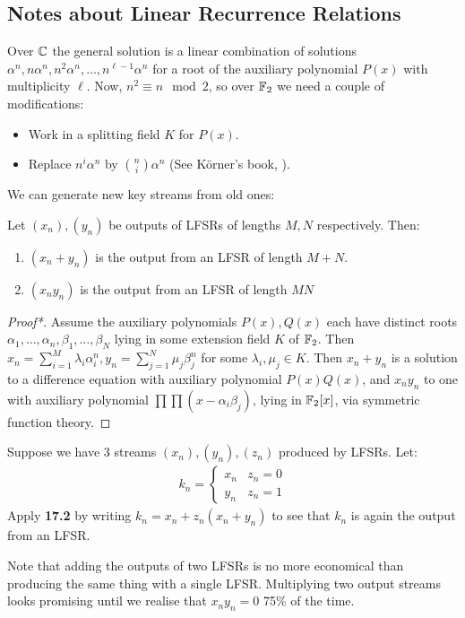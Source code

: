\documentclass[10pt,a4paper]{article}
\begin{document}
\subsection{Notes about Linear Recurrence Relations}
Over $\mathbb{C}$ the general solution is a linear combination of solutions $\alpha^n, n\alpha^n, n^2\alpha^n, \ldots, n^{\ell-1}\alpha^n$ for a root of the auxiliary polynomial $P(x)$ with multiplicity $\ell$. Now, $n^2 \equiv n \mod 2$, so over $\mathbb{F}_2$ we need a couple of modifications:
\begin{itemize}
\item Work in a splitting field $K$ for $P(x)$. 
\item Replace $n^i \alpha^n$ by $\binom{n}{i}\alpha^n$ (See K\"orner's book, ).
\end{itemize}
We can generate new key streams from old ones:
\begin{lemma}
Let $(x_n), (y_n)$ be outputs of LFSRs of lengths $M,N$ respectively. Then:
\begin{enumerate}
\item $(x_n+y_n)$ is the output from an LFSR of length $M+N$.
\item $(x_ny_n)$ is the output from an LFSR of length $MN$
\end{enumerate}
\end{lemma}
\begin{proof}[Proof*]
Assume the auxiliary polynomials $P(x), Q(x)$ each have distinct roots $\alpha_1, \ldots, \alpha_n, \beta_1, \ldots, \beta_N$ lying in some extension field $K$ of $\mathbb{F}_2$. Then $x_n = \sum_{i=1}^M \lambda_i \alpha_i^n, y_n = \sum_{j=1}^N \mu_j \beta_j^n$ for some $\lambda_i, \mu_j \in K$. Then $x_n+y_n$ is a solution to a difference equation with auxiliary polynomial $P(x)Q(x)$, and $x_ny_n$ to one with auxiliary polynomial $\prod\prod (x-\alpha_i\beta_j)$, lying in $\mathbb{F}_2[x]$, via symmetric function theory.
\end{proof}
\example Suppose we have 3 streams $(x_n), (y_n), (z_n)$ produced by LFSRs. Let:
\begin{align*}
k_n = \begin{cases} x_n & z_n = 0 \\ y_n & z_n = 1\end{cases}
\end{align*}
Apply \textbf{17.2} by writing $k_n = x_n + z_n(x_n+y_n)$ to see that $k_n$ is again the output from an LFSR. 

Note that adding the outputs of two LFSRs is no more economical than producing the same thing with a single LFSR. Multiplying two output streams looks promising until we realise that $x_ny_n = 0$ 75\% of the time.
\end{document}
